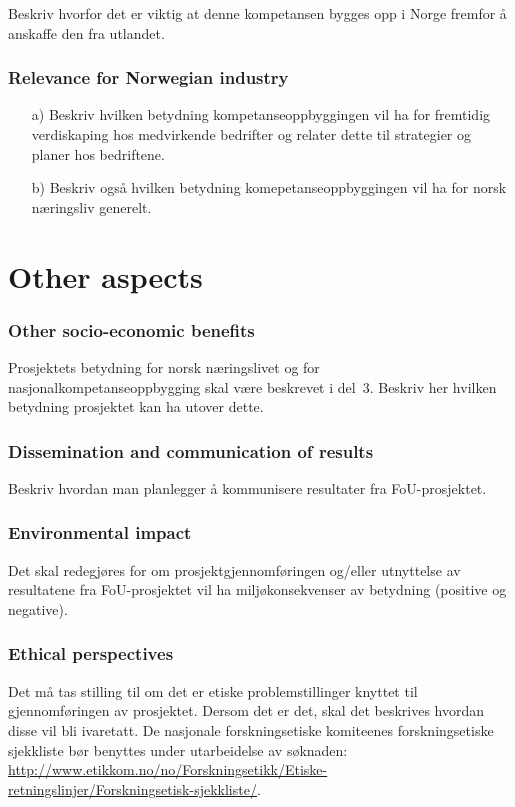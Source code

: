 \documentclass[11pt,a4paper,british]{article}
\begin{document}
Beskriv hvorfor det er viktig at denne kompetansen bygges opp i Norge fremfor å anskaffe den fra utlandet.

\section{Relevance for Norwegian industry}
\begin{itemize}
	\item[a)] Beskriv hvilken betydning kompetanseoppbyggingen vil ha for fremtidig verdiskaping hos medvirkende bedrifter og relater dette til strategier og planer hos bedriftene.
	\item[b)] Beskriv også hvilken betydning komepetanseoppbyggingen vil ha for norsk næringsliv generelt. 
\end{itemize}

\part{Other aspects}

\section{Other socio-economic benefits}
Prosjektets betydning for norsk næringslivet og for nasjonalkompetanseoppbygging skal være beskrevet i del~3.
Beskriv her hvilken betydning prosjektet kan ha utover dette. 

\section{Dissemination and communication of results}
Beskriv hvordan man planlegger å kommunisere resultater fra FoU-prosjektet.

\section{Environmental impact}
Det skal redegjøres for om prosjektgjennomføringen og/eller utnyttelse av resultatene fra FoU-prosjektet vil ha miljøkonsekvenser av betydning (positive og negative).

\section{Ethical perspectives}
Det må tas stilling til om det er etiske problemstillinger knyttet til gjennomføringen av prosjektet.
Dersom det er det, skal det beskrives hvordan disse vil bli ivaretatt.
De nasjonale forskningsetiske komiteenes forskningsetiske sjekkliste bør benyttes under utarbeidelse av søknaden:
\url{http://www.etikkom.no/no/Forskningsetikk/Etiske-retningslinjer/Forskningsetisk-sjekkliste/}.
\end{document}
